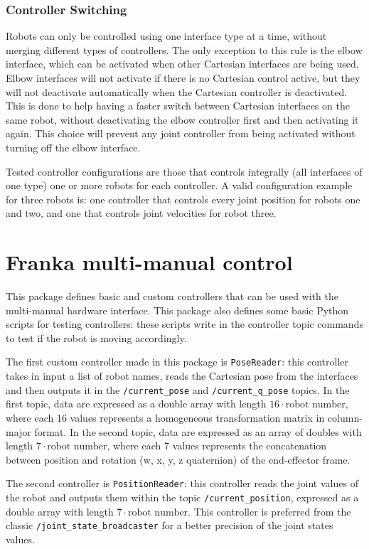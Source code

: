 \documentclass{article}
\begin{document}
\subsubsection{Controller Switching}
Robots can only be controlled using one interface type at a time, without merging different types of controllers. The only exception to this rule is the elbow interface, which can be activated when other Cartesian interfaces are being used. Elbow interfaces will not activate if there is no Cartesian control active, but they will not deactivate automatically when the Cartesian controller is deactivated. This is done to help having a faster switch between Cartesian interfaces on the same robot, without deactivating the elbow controller first and then activating it again. This choice will prevent any joint controller from being activated without turning off the elbow interface.

Tested controller configurations are those that controls integrally (all interfaces of one type) one or more robots for each controller.
A valid configuration example for three robots is: one controller that controls every joint position for robots one and two, and one that controls joint velocities for robot three.

\section{Franka multi-manual control}

This package defines basic and custom controllers that can be used with the multi-manual hardware interface. This package also defines some basic Python scripts for testing controllers: these scripts write in the controller topic commands to test if the robot is moving accordingly. 

The first custom controller made in this package is \texttt{PoseReader}: this controller takes in input a list of robot names, reads the Cartesian pose from the interfaces and then outputs it in the \texttt{/current\_pose} and \texttt{/current\_q\_pose} topics. In the first topic, data are expressed as a double array with length $16 \cdot \text{robot number}$, where each 16 values represents a homogeneous transformation matrix in column-major format. In the second topic, data are expressed as an array of doubles with length $7 \cdot \text{robot number}$, where each 7 values represents the concatenation between position and rotation (w, x, y, z quaternion) of the end-effector frame.  

The second controller is \texttt{PositionReader}: this controller reads the joint values of the robot and outputs them within the topic \texttt{/current\_position}, expressed as a double array with length $7 \cdot \text{robot number}$. This controller is preferred from the classic \texttt{/joint\_state\_broadcaster} for a better precision of the joint states values.
\end{document}
